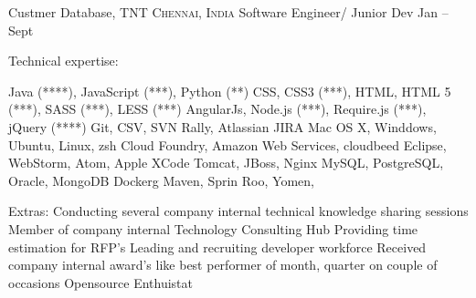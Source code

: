 \documentclass[10pt,a4paper]{article}
\begin{document}
\headedsection
  {\textnormal{Custmer Database, TNT}}
  {\textsc{Chennai, India}} {
  \headedsubsection
    {Software Engineer/ Junior Dev}
    {Jan  -- Sept }
    {}
}

\spacedhrule{0.5em}{-0.4em}


\inlineheadsection  %
  {Technical expertise:}
  { \sbull Java (****), JavaScript (***), Python (**) 
    \sbull CSS, CSS3 (***), HTML, HTML 5 (***), SASS (***), LESS (***)
    \sbull AngularJs, Node.js (***), Require.js (***), jQuery (****)
    \sbull Git, CSV, SVN
    \sbull Rally, Atlassian JIRA
    \sbull Mac OS X, Winddows, Ubuntu, Linux, zsh
    \sbull Cloud Foundry, Amazon Web Services, cloudbeed
    \sbull Eclipse,  WebStorm,  Atom, Apple XCode
    \sbull Tomcat, JBoss, Nginx
    \sbull MySQL, PostgreSQL, Oracle, MongoDB
    \sbull Dockerg
    \sbull Maven, Sprin Roo, Yomen, 

    
  }
  {Extras:}{ 
  \sbull Conducting several company internal technical knowledge sharing sessions   
  \sbull Member of company internal Technology Consulting Hub  
  \sbull Providing time estimation for RFP's 
  \sbull Leading and recruiting developer workforce} 
  \sbull Received company internal award's like best performer of month, quarter on couple of occasions
  \sbull Opensource Enthuistat
\end{document}
